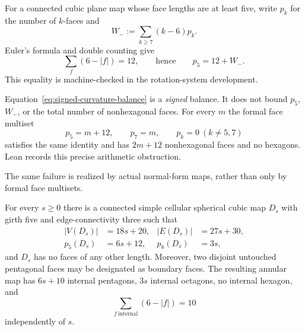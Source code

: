 For a connected cubic plane map whose face lengths are at least five, write
$p_k$ for the number of $k$-faces and
\[
             W_-:=\sum_{k\ge7}(k-6)p_k.
\]
Euler's formula and double counting give
\begin{equation}
  \sum_f(6-|f|)=12,
  \qquad\text{hence}\qquad
  p_5=12+W_-.
  \label{eq:signed-curvature-balance}
\end{equation}
This equality is machine-checked in the rotation-system development.

Equation~\eqref{eq:signed-curvature-balance} is a \emph{signed} balance.  It
does not bound $p_5$, $W_-$, or the total number of nonhexagonal faces.  For
every $m$ the formal face multiset
\[
                p_5=m+12,\qquad p_7=m,\qquad p_k=0\ (k\ne5,7)
\]
satisfies the same identity and has $2m+12$ nonhexagonal faces and no
hexagons.  Lean records this precise arithmetic obstruction.

The same failure is realized by actual normal-form maps, rather than only by
formal face multisets.

\begin{proposition}
\label{prop:dodecahedral-chain-no-hexagons}
\Sprose
For every $s\geq0$ there is a connected simple cellular spherical cubic map
$D_s$ with girth five and edge-connectivity three such that
\[
 \begin{aligned}
 |V(D_s)|&=18s+20,& |E(D_s)|&=27s+30,\\
 p_5(D_s)&=6s+12,& p_8(D_s)&=3s,
 \end{aligned}
\]
and $D_s$ has no faces of any other length.  Moreover, two disjoint untouched
pentagonal faces may be designated as boundary faces.  The resulting annular
map has $6s+10$ internal pentagons, $3s$ internal octagons, no internal
hexagon, and
\[
             \sum_{f\ \mathrm{internal}}(6-|f|)=10
\]
independently of $s$.
\end{proposition}

